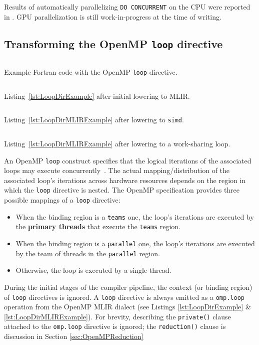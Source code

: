 \documentclass[acmtog,natbib=false]{acmart}
\newcommand{\code}[1]{\texttt{#1}\xspace}
\begin{document}
Results of automatically parallelizing \code{DO CONCURRENT} on the CPU were reported in \cite{rouson2025automatically}. GPU parallelization is still work-in-progress at the time of writing.

\subsection{Transforming the OpenMP \code{loop} directive}

\begin{listing}[t]
\inputminted{Fortran}{code/loop_dir_reduction.f90}
\caption{Example Fortran code with the OpenMP \code{loop} directive.}
\label{lst:LoopDirExample}
\end{listing}

\begin{listing}[t]
\inputminted{MLIR-lexer.py:MlirLexer -x}{code/loop_dir_reduction.mlir}
\caption{Listing~\ref{lst:LoopDirExample} after initial lowering to MLIR.}
\label{lst:LoopDirMLIRExample}
\end{listing}

\begin{listing}[t]
\inputminted{MLIR-lexer.py:MlirLexer -x}{code/loop_dir_simd.mlir}
\caption{Listing~\ref{lst:LoopDirMLIRExample} after lowering to \code{simd}.}
\label{lst:LoopDirSIMDExample}
\end{listing}

\begin{listing}[t]
\inputminted{MLIR-lexer.py:MlirLexer -x}{code/loop_dir_wsloop.mlir}
\caption{Listing~\ref{lst:LoopDirMLIRExample} after lowering to a work-sharing loop.}
\label{lst:LoopDirWSLoopExample}
\end{listing}

An OpenMP \code{loop} construct specifies that the logical iterations of the associated loops may execute concurrently~\cite{OARB21}.
The actual mapping/distribution of the associated loop's iterations across hardware resources depends on the region in which the \code{loop} directive is nested.
The OpenMP specification provides three possible mappings of a \code{loop} directive:
\begin{itemize}
    \item When the binding region is a \code{teams} one, the loop's iterations are executed by the \textbf{primary threads} that execute the \code{teams} region.
    \item When the binding region is a \code{parallel} one, the loop's iterations are executed by the team of threads in the \code{parallel} region.
    \item Otherwise, the loop is executed by a single thread.
\end{itemize}
During the initial stages of the compiler pipeline, the context (or binding region) of \code{loop} directives is ignored.
A \code{loop} directive is always emitted as a \code{omp.loop} operation from the OpenMP MLIR dialect (see Listings \ref{lst:LoopDirExample} \& \ref{lst:LoopDirMLIRExample}).
For brevity, describing the \code{private()} clause attached to the \code{omp.loop} directive is ignored; the \code{reduction()} clause is discussion in Section \ref{sec:OpenMPReduction}
\end{document}
